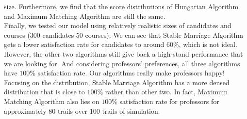 \documentclass[twoside,twocolumn]{article}
\begin{document}
    size. Furthermore, we find that the score distributions of Hungarian Algorithm and Maximum Matching Algorithm are still the same.
    \\ \indent Finally, we tested our model using relatively realistic sizes of candidates and courses (300 candidates 50 courses). We can see that Stable Marriage Algorithm
    gets a lower satisfaction rate for candidates to around $60\%$, which is not ideal. However, the other two algorithms still give back a high-stand performance that we 
    are looking for. And considering professors' preferences, all three algorithms have $100\%$ satisfaction rate. Our algorithms really make professors happy! Focusing on the 
    distribution, Stable Marriage Algorithm has a more densed distribution that is close to $100\%$ rather than other two. In fact, Maximum Matching Algorithm also lies on 
    $100\%$ satisfaction rate for professors for approximately 80 trails over 100 trails of simulation. 
\end{document}
